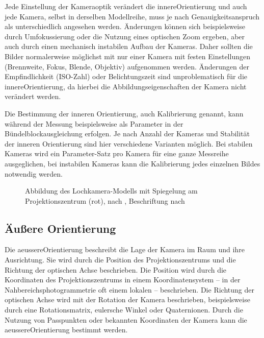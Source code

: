 \documentclass[./00PhotoBox.tex]{subfiles}
\begin{document}
Jede Einstellung der Kameraoptik verändert die \gls{innereOrientierung} und auch jede Kamera, selbst in derselben Modellreihe, muss je nach Genauigkeitsanspruch als unterschiedlich angesehen werden. Änderungen können sich beispielsweise durch Umfokussierung oder die Nutzung eines optischen Zoom ergeben, aber auch durch einen mechanisch instabilen Aufbau der Kameras. Daher sollten die Bilder normalerweise möglichst mit nur einer Kamera mit festen Einstellungen (Brennweite, Fokus, Blende, Objektiv) aufgenommen werden. Änderungen der Empfindlichkeit (ISO-Zahl) oder Belichtungszeit sind unproblematisch für die \gls{innereOrientierung}, da hierbei die Abbildungseigenschaften der Kamera nicht verändert werden. \citep[S. 176]{luhmann}

Die Bestimmung der inneren Orientierung, auch Kalibrierung genannt, kann wäh\-rend der Messung beispielsweise als Parameter in der Bündel\-block\-ausgleichung erfolgen. Je nach Anzahl der Kameras und Stabilität der inneren Orientierung sind hier verschiedene Varianten möglich. Bei stabilen Kameras wird ein Parameter-Satz pro Kamera für eine ganze Messreihe ausgeglichen, bei instabilen Kameras kann die Kalibrierung jedes einzelnen Bildes notwendig werden. \citep[S. 181f]{luhmann}

\begin{figure}
    \centering
    
    \caption{Abbildung des Lochkamera-Modells mit Spiegelung am Projektionszentrum (rot), nach \citealt[S. 154]{hartley}, Beschriftung nach \citealt{luhmann}} %
    \label{img:optische_achse}
\end{figure}


\subsection{Äußere Orientierung}
\label{s:aeussereorientierung}
Die \gls{aeussereOrientierung} beschreibt die Lage der Kamera im Raum und ihre Ausrichtung. Sie wird durch die Position des Projektionszentrums und die Richtung der optischen Achse beschrieben. Die Position wird durch die Koordinaten des Projektionszentrums in einem Koordinatensystem -- in der Nahbereichsphotogrammetrie oft einem lokalen -- beschrieben. Die Richtung der optischen Achse wird mit der Rotation der Kamera beschrieben, beispielsweise durch eine Rotationsmatrix, eulersche Winkel oder Quaternionen. Durch die Nutzung von Passpunkten oder bekannten Koordinaten der Kamera kann die \gls{aeussereOrientierung} bestimmt werden. \citep[S. 273ff]{luhmann}
\end{document}
